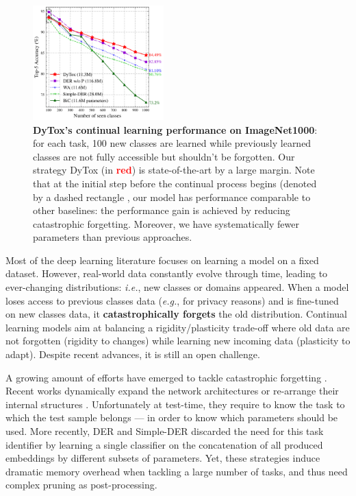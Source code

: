 \begin{figure}
    \centering
    \includegraphics[width=0.45\textwidth]{images/dytox/imagenet1000.png}
    \caption{\textbf{DyTox's continual learning performance on ImageNet1000}: for each task, 100 new
        classes are learned while previously learned classes are not fully accessible but shouldn't be
        forgotten. Our strategy DyTox (in \textbf{\textcolor{red}{red}}) is state-of-the-art by a large
        margin. Note that at the initial step before the continual process begins (denoted by a dashed
        rectangle , our model has performance
        comparable to other baselines: the performance gain is achieved by reducing catastrophic
        forgetting. Moreover, we have systematically fewer parameters than previous approaches.}
    \label{fig:dytox_imagenet1000}
\end{figure}

Most of the deep learning literature focuses on learning a model on a fixed dataset. However,
real-world data constantly evolve through time, leading to ever-changing distributions:
\textit{i.e.}, new classes or domains appeared. When a model loses access to previous classes data
(\textit{e.g.}, for privacy reasons) and is fine-tuned on new classes data, it
\textbf{catastrophically forgets} the old distribution. Continual learning models aim at balancing a
rigidity/plasticity trade-off where old data are not forgotten (rigidity to changes) while learning
new incoming data (plasticity to adapt). Despite recent advances, it is still an open challenge.

A growing amount of efforts have emerged to tackle catastrophic forgetting
\cite{rebuffi2017icarl,kirkpatrick2017ewc,wu2019bias_correction,hou2019ucir,douillard2020podnet,yan2021der}.
Recent works
\cite{yoon2018dynamically_expandable_networks,li2019learning_to_grow,hung2019cpg,fernando2017path_net,golkar2019neural_pruning,serra2018hat}
dynamically expand the network architectures
\cite{yoon2018dynamically_expandable_networks,li2019learning_to_grow} or re-arrange their internal
structures \cite{fernando2017path_net,serra2018hat,hung2019cpg,golkar2019neural_pruning}.
Unfortunately at test-time, they require to know the task to which the test sample belongs --- in
order to know which parameters should be used. More recently, DER \cite{yan2021der} and Simple-DER
\cite{li2021preserve} discarded the need for this task identifier by learning a single classifier on
the concatenation of all produced embeddings by different subsets of parameters. Yet, these
strategies induce dramatic memory overhead when tackling a large number of tasks, and thus need
complex pruning as post-processing.



